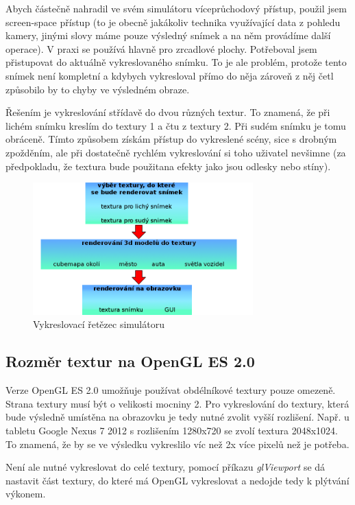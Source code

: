 \documentclass[11pt,twoside,a4paper]{book}
\begin{document}
Abych částečně nahradil ve svém simulátoru víceprůchodový přístup, použil jsem screen-space přístup (to je obecně jakákoliv technika využívající data z pohledu kamery, jinými slovy máme pouze výsledný snímek a na něm provádíme další operace). V praxi se používá hlavně pro zrcadlové plochy. Potřeboval jsem přistupovat do aktuálně vykreslovaného snímku. To je ale problém, protože tento snímek není kompletní a kdybych vykresloval přímo do něj\linebreak a zároveň z něj četl způsobilo by to chyby ve výsledném obraze.

Řešením je vykreslování střídavě do dvou různých textur. To znamená, že při lichém snímku kreslím do textury 1 a čtu z textury 2. Při sudém snímku je tomu obráceně. Tímto způsobem získám přístup do vykreslené scény, sice s drobným zpožděním, ale při dostatečně rychlém vykreslování si toho uživatel nevšimne (za předpokladu, že textura bude použita\linebreak na efekty jako jsou odlesky nebo stíny).

\begin{center}
\begin{figure}[h!]
\includegraphics[width=85mm]{figures/render-schema.png}
\caption{Vykreslovací řetězec simulátoru}
\end{figure}
\end{center}

\subsection{Rozměr textur na OpenGL ES 2.0}
Verze OpenGL ES 2.0 umožňuje používat obdélníkové textury pouze omezeně. Strana textury musí být o velikosti mocniny 2.
Pro vykreslování do textury, která bude výsledně umístěna na obrazovku je tedy nutné zvolit vyšší rozlišení. Např. u tabletu Google Nexus 7 2012 s rozlišením 1280x720 se zvolí textura 2048x1024. To znamená, že by se ve výsledku vykreslilo víc než 2x více pixelů než je potřeba.

Není ale nutné vykreslovat do celé textury, pomocí příkazu \textit{glViewport} se dá nastavit část textury, do které má OpenGL vykreslovat a nedojde tedy k plýtvání výkonem.
\end{document}
